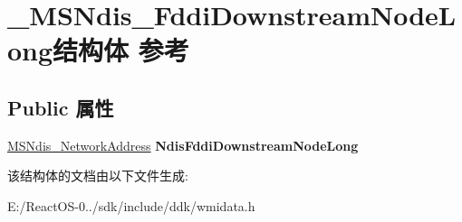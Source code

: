 \hypertarget{struct___m_s_ndis___fddi_downstream_node_long}{}\section{\+\_\+\+M\+S\+Ndis\+\_\+\+Fddi\+Downstream\+Node\+Long结构体 参考}
\label{struct___m_s_ndis___fddi_downstream_node_long}
\subsection*{Public 属性}
\begin{DoxyCompactItemize}
\item 
\mbox{\label{struct___m_s_ndis___fddi_downstream_node_long_a7a4975cf58a760ed9598ff3988c6e347}} 
\hyperlink{struct___m_s_ndis___network_address}{M\+S\+Ndis\+\_\+\+Network\+Address} {\bfseries Ndis\+Fddi\+Downstream\+Node\+Long}
\end{DoxyCompactItemize}


该结构体的文档由以下文件生成\+:\begin{DoxyCompactItemize}
\item 
E\+:/\+React\+O\+S-\/0../sdk/include/ddk/wmidata.\+h\end{DoxyCompactItemize}
